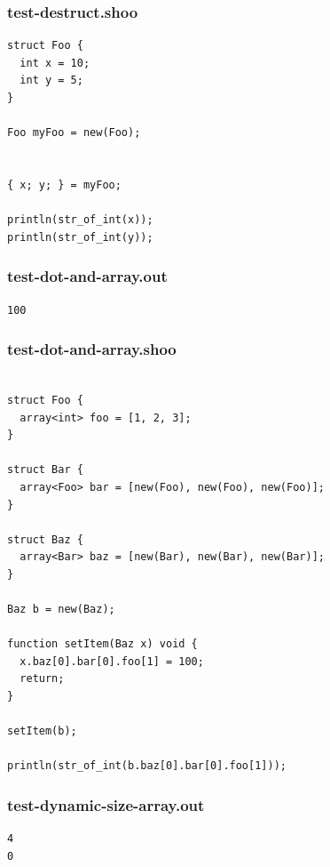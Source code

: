 \documentclass[12pt]{article}
\begin{document}
\subsubsection{test-destruct.shoo}
\begin{mdframed}[hidealllines=true,backgroundcolor=blue!10]
\begin{lstlisting}
struct Foo {
  int x = 10;
  int y = 5;
}

Foo myFoo = new(Foo);


{ x; y; } = myFoo;

println(str_of_int(x));
println(str_of_int(y));
\end{lstlisting}
\end{mdframed}
\subsubsection{test-dot-and-array.out}
\begin{mdframed}[hidealllines=true,backgroundcolor=green!10]
\begin{lstlisting}
100
\end{lstlisting}
\end{mdframed}
\subsubsection{test-dot-and-array.shoo}
\begin{mdframed}[hidealllines=true,backgroundcolor=blue!10]
\begin{lstlisting}

struct Foo {
  array<int> foo = [1, 2, 3];
}

struct Bar {
  array<Foo> bar = [new(Foo), new(Foo), new(Foo)];
}

struct Baz {
  array<Bar> baz = [new(Bar), new(Bar), new(Bar)];
}

Baz b = new(Baz);

function setItem(Baz x) void {
  x.baz[0].bar[0].foo[1] = 100;
  return;
}

setItem(b);

println(str_of_int(b.baz[0].bar[0].foo[1]));

\end{lstlisting}
\end{mdframed}
\subsubsection{test-dynamic-size-array.out}
\begin{mdframed}[hidealllines=true,backgroundcolor=green!10]
\begin{lstlisting}
4
0
\end{lstlisting}
\end{mdframed}
\end{document}
